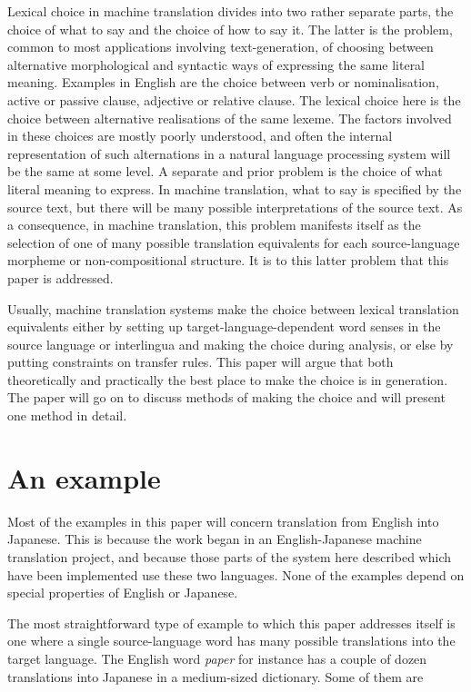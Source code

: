 Lexical choice in machine translation divides into two rather separate parts,
the choice of what to say and the choice of how to say it.
The latter is the problem, common to most applications involving
text-generation, of choosing between alternative morphological and syntactic
ways of expressing the same literal meaning. Examples in English are the
choice between verb or nominalisation, active or passive clause,
adjective or relative clause. The lexical choice here is the choice
between alternative realisations of the same lexeme. The factors involved
in these choices are mostly poorly understood, and often the internal
representation of such alternations in a natural language processing
system will be the same at some level. A separate and prior problem is the
choice of what literal meaning to express.
In machine translation, what to say is specified by the source text, but there will be many possible interpretations of the source text.
As a consequence, in machine translation, this problem manifests itself
as the selection of one of many possible translation equivalents for each
source-language morpheme or non-compositional structure. It is to this latter
problem that this paper is addressed.

Usually, machine translation systems make the choice between lexical
translation
equivalents either by setting up target-language-dependent word senses in
the source language or interlingua and making the choice during analysis,
or else by putting constraints on transfer rules. This paper will argue that
both theoretically and practically the best place to make the
choice is in generation. The paper will go on to discuss methods of
making the choice and will present one method in detail.

\section{An example}

Most of the examples in this paper will concern translation from English
into Japanese.
This is because the work began in an English-Japanese machine
translation project, and because those parts of the system here
described which have been implemented use these two languages.
None of the examples depend on special properties of English or Japanese.

The most straightforward type of example to which this paper addresses
itself is one where a single source-language word has many possible
translations into the target language. The English word {\it paper\/}
for instance has a couple of dozen translations into Japanese in a
medium-sized dictionary. Some of them are

